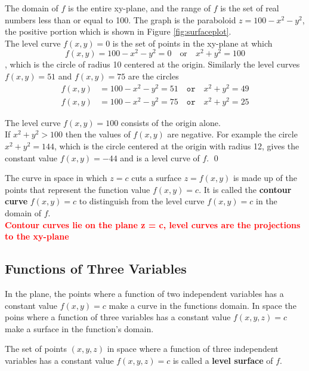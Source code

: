 \documentclass[12pt,a4paper,draft]{article}
\newenvironment{definition}{\begin{definitionbox}}{\end{definitionbox}\vspace{1\baselineskip}}
\begin{document}
\begin{solution}
    The domain of \(f\) is the entire xy-plane, and the range of \(f\) is the set of real numbers less than or equal to 100. The graph is the paraboloid \(z = 100 - x^2 - y^2\), the positive portion which is shown in Figure \ref{fig:surfaceplot}. \\
    The level curve \(f(x,y) = 0\) is the set of points in the xy-plane at which
    \[f(x,y) = 100 - x^2 - y^2 = 0 \quad \text{or} \quad x^2 + y^2 =100\],
    which is the circle of radius 10 centered at the origin. Similarly the level curves \(f(x,y) = 51\) and \(f(x,y) = 75\) are the circles
    \begin{align*}
        f(x,y) &= 100 - x^2 - y^2 = 51 \quad \mathtt{or}  \quad x^2 + y^2 = 49 \\
        f(x,y) &= 100 - x^2 - y^2 = 75  \quad \mathtt{or}  \quad x^2 + y^2 = 25
    \end{align*}
    
    The level curve \(f(x,y) = 100\) consists of the origin alone. \\
    If \(x^2 + y^2 > 100\) then the values of \(f(x,y)\) are negative. For example the circle \(x^2 + y^2 = 144\), which is the circle centered at the origin with radius 12, gives the constant value \(f(x,y) = -44\) and is a level curve of \(f\). \hfill \qed

    The curve in space in which \(z = c\) cuts a surface \(z = f(x,y)\) is made up of the points that represent the function value \(f(x,y) = c\). It is called the \textbf{contour curve} \(f(x,y) =c\) to distinguish from the level curve \(f(x,y) =c\) in the domain of \(f\). \\
    \textcolor{red}{\textbf{Contour curves lie on the plane z = c, level curves are the projections to the xy-plane}}

\end{solution}

\newpage
\subsection{Functions of Three Variables}

In the plane, the points where a function of two independent variables has a constant value \(f(x,y) =c\) make a curve in the functions domain. In space the poins where a function of three variables has a constant value \(f(x,y,z) =c\) make a surface in the function's domain.

\begin{definition}
    The set of points \((x,y,z)\) in space where a function of three independent variables has a constant value \(f(x,y,z) =c\) is called a \textbf{level surface} of \(f\).
\end{definition}
\end{document}
